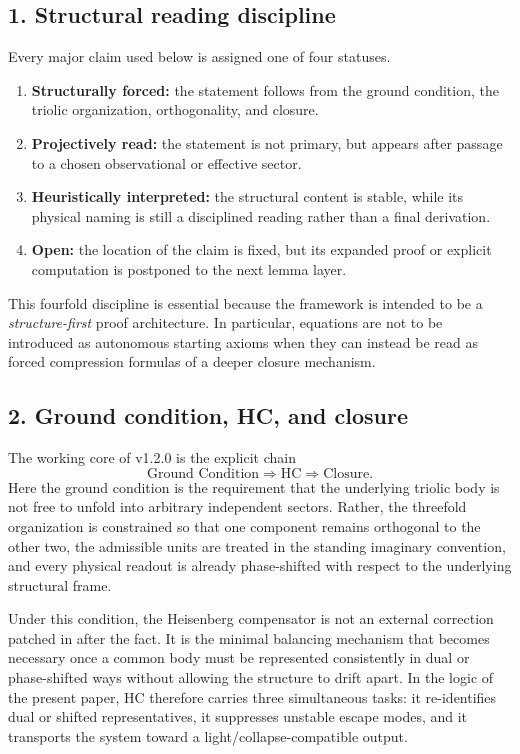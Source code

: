 \subsection*{1. Structural reading discipline}
Every major claim used below is assigned one of four statuses.
\begin{enumerate}[leftmargin=2em,label=(\alph*)]
  \item \textbf{Structurally forced:} the statement follows from the ground
  condition, the triolic organization, orthogonality, and closure.
  \item \textbf{Projectively read:} the statement is not primary, but appears
  after passage to a chosen observational or effective sector.
  \item \textbf{Heuristically interpreted:} the structural content is stable,
  while its physical naming is still a disciplined reading rather than a final
  derivation.
  \item \textbf{Open:} the location of the claim is fixed, but its expanded
  proof or explicit computation is postponed to the next lemma layer.
\end{enumerate}

This fourfold discipline is essential because the framework is intended to be a
\emph{structure-first} proof architecture. In particular, equations are not to
be introduced as autonomous starting axioms when they can instead be read as
forced compression formulas of a deeper closure mechanism.

\subsection*{2. Ground condition, HC, and closure}
The working core of v1.2.0 is the explicit chain
\[
\text{Ground Condition} \Longrightarrow \text{HC} \Longrightarrow \text{Closure}.
\]
Here the ground condition is the requirement that the underlying triolic body is
not free to unfold into arbitrary independent sectors. Rather, the threefold
organization is constrained so that one component remains orthogonal to the
other two, the admissible units are treated in the standing imaginary
convention, and every physical readout is already phase-shifted with respect to
the underlying structural frame.

Under this condition, the Heisenberg compensator is not an external correction
patched in after the fact. It is the minimal balancing mechanism that becomes
necessary once a common body must be represented consistently in dual or
phase-shifted ways without allowing the structure to drift apart. In the logic
of the present paper, HC therefore carries three simultaneous tasks: it
re-identifies dual or shifted representatives, it suppresses unstable escape
modes, and it transports the system toward a light/collapse-compatible output.

